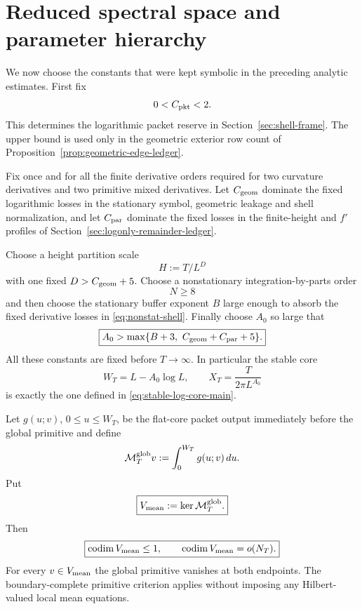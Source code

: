 \section{Reduced spectral space and parameter hierarchy}
\label{sec:retained}

We now choose the constants that were kept symbolic in the preceding analytic
estimates.  First fix
\[
0<C_{\rm pkt}<2.
\]
This determines the logarithmic packet reserve in
Section~\ref{sec:shell-frame}.  The upper bound is used only in the geometric
exterior row count of Proposition~\ref{prop:geometric-edge-ledger}.

Fix once and for all the finite derivative orders required for two curvature
derivatives and two primitive mixed derivatives.  Let
$C_{\rm geom}$ dominate the fixed logarithmic losses in the stationary symbol,
geometric leakage and shell normalization, and let $C_{\rm par}$ dominate the
fixed losses in the finite-height and $f'$ profiles of
Section~\ref{sec:logonly-remainder-ledger}.

Choose a height partition scale
\[
H:=T/L^D
\]
with one fixed $D>C_{\rm geom}+5$.
Choose a nonstationary integration-by-parts order
\begin{equation}
\boxed{N\ge8}
\label{eq:nonstationary-order-choice}
\end{equation}
and then choose the stationary buffer exponent $B$ large enough to absorb the
fixed derivative losses in \eqref{eq:nonstat-shell}.  Finally choose $A_0$ so
large that
\begin{equation}
\boxed{
A_0>\max\{B+3,\ C_{\rm geom}+C_{\rm par}+5\}.
}
\label{eq:acyclic-A0-choice}
\end{equation}
All these constants are fixed before $T\to\infty$.  In particular the stable
core
\[
W_T=L-A_0\log L,
\qquad
X_T=\frac{T}{2\pi L^{A_0}}
\]
is exactly the one defined in \eqref{eq:stable-log-core-main}.

\begin{lemma}
\label{lem:mean-zero-space}
Let $g(u;v)$, $0\le u\le W_T$, be the flat-core packet output immediately
before the global primitive and define
\begin{equation}
\mathcal M_T^{\rm glob}v:=\int_0^{W_T}g(u;v)\,du.
\label{eq:global-mean-map}
\end{equation}
Put
\begin{equation}
\boxed{
V_{\rm mean}:=\ker\mathcal M_T^{\rm glob}.
}
\label{eq:mean-map}
\end{equation}
Then
\begin{equation}
\boxed{
\operatorname{codim} V_{\rm mean}\le1,\qquad \operatorname{codim} V_{\rm mean}=o(N_T).
}
\label{eq:mean-codim}
\end{equation}
For every $v\in V_{\rm mean}$ the global primitive vanishes at both endpoints.
The boundary-complete primitive criterion applies without imposing any
Hilbert-valued local mean equations.
\end{lemma}

